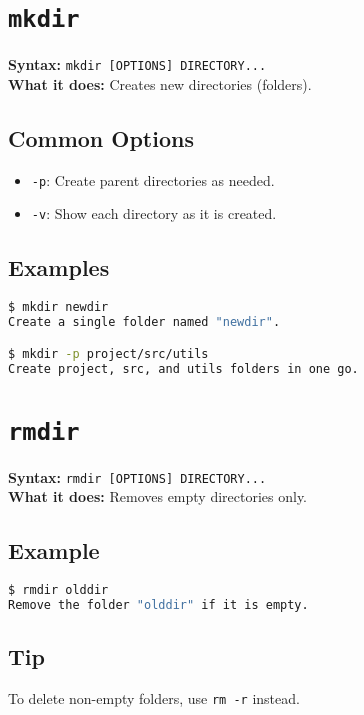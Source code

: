 \documentclass[10pt,oneside]{scrbook}
\begin{document}
\section{\texttt{mkdir}}
\begin{cmdbox}
  \textbf{Syntax:} \lstinline!mkdir [OPTIONS] DIRECTORY...! \\
  \textbf{What it does:} Creates new directories (folders).
\end{cmdbox}
\begin{commanddetails}
  \subsection*{Common Options}
  \begin{itemize}
    \item \lstinline!-p!: Create parent directories as needed.
    \item \lstinline!-v!: Show each directory as it is created.
  \end{itemize}

  \subsection*{Examples}
  \begin{lstlisting}[language=bash]
$ mkdir newdir
Create a single folder named "newdir".

$ mkdir -p project/src/utils
Create project, src, and utils folders in one go.
  \end{lstlisting}
\end{commanddetails}

\section{\texttt{rmdir}}
\begin{cmdbox}
  \textbf{Syntax:} \lstinline!rmdir [OPTIONS] DIRECTORY...! \\
  \textbf{What it does:} Removes empty directories only.
\end{cmdbox}
\begin{commanddetails}
  \subsection*{Example}
  \begin{lstlisting}[language=bash]
$ rmdir olddir
Remove the folder "olddir" if it is empty.
  \end{lstlisting}

  \subsection*{Tip}
  To delete non-empty folders, use \lstinline!rm -r! instead.
\end{commanddetails}
\end{document}
